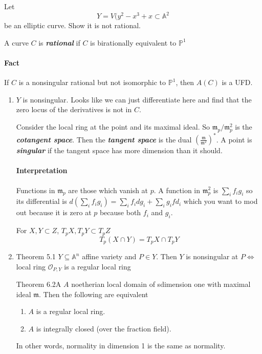 \begin{manualexercise}{6.2}
Let
	\[Y=V(y^2-x^3+x\subset \mathbb{A}^2\]
	be an elliptic curve. Show it is not rational.
\end{manualexercise}

\begin{defn}
	A curve $C$ is \textit{\textbf{rational}} if $C$ is birationally equivalent to $\mathbb{P}^1$
\end{defn}

\paragraph{Fact} If $C$ is a nonsingular rational but not isomorphic to $\mathbb{P}^1$, then $A(C)$ is a UFD.

\begin{enumerate}[label=\textbf{Step \arabic*}]
	\item $Y$ is nonsingular. Looks like we can just differentiate here and find that the zero locus of the derivatives is not in $C$.
\begin{defn}
	Consider the local ring at the point and its maximal ideal. So $\mathfrak{m}_{p}/\mathfrak{m}^2_p$ is the \textit{\textbf{cotangent space}}. Then the  \textit{\textbf{tangent space}} is the dual  $\left(\frac{\mathfrak{m}}{\mathfrak{m}^2}\right)^*$. A point is \textit{\textbf{singular}} if the tangent space has more dimension than it should.
\end{defn}

\paragraph{Interpretation} Functions in $\mathfrak{m}_p$ are those which vanish at $p$. A function in $\mathfrak{m}^2_{p}$ is $\sum_{i}f_ig_i$ so its differential is $ d \left( \sum_{i}f_ig_i \right) =\sum_{i}f_idg_i+\sum_{i}g_ifd_i$ which you want to mod out because it is zero at $p$ because both $f_{i}$ and $g_{i}$.

\begin{remark}
	For $X,Y\subset Z$, $T_pX,T_pY\subset T_pZ$
	\[T_p(X\cap Y)=T_pX\cap T_pY\]
\end{remark}

\item 
	\begin{thing6}{Theorem 5.1}\leavevmode
		$Y\subseteq \mathbb{A}^n$ affine variety and $P\in Y$. Then $Y$ is nonsingular at $P \iff $ local ring $\mathcal{O}_{P,Y}$ is a regular local ring
	\end{thing6}
	\begin{thing6}{Theorem 6.2A}\leavevmode
		$A$ noetherian local domain of sdimension one with maximal ideal $\mathfrak{m}$. Then the following are equivalent
		\begin{enumerate}[label=(\roman*)]
			\item $A$ is a regular local ring.
			\item $A$ is integrally closed (over the fraction field).
		\end{enumerate}
	\end{thing6}
	In other words, normality in dimension 1 is the same as normality.


\end{enumerate}
